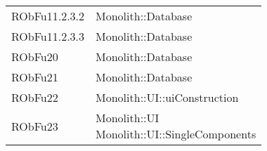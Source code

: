 \begin{center}
\begin{longtable}{|
*{1}{>{\centering\arraybackslash}m{2.5cm}|}
*{1}{>{\centering\arraybackslash}m{7.5cm}|}}
{\\}\\\hline
RObFu11.2.3.2 & \makecell[l]{Monolith::Database
\\}\\\hline
RObFu11.2.3.3 & \makecell[l]{Monolith::Database
\\}\\\hline
RObFu20 & \makecell[l]{Monolith::Database
\\}\\\hline
RObFu21 & \makecell[l]{Monolith::Database
\\}\\\hline
RObFu22 & \makecell[l]{Monolith::UI::uiConstruction
\\}\\\hline
RObFu23 & \makecell[l]{Monolith::UI
\\Monolith::UI::SingleComponents
\\}\\\hline
\end{longtable}
\end{center}
